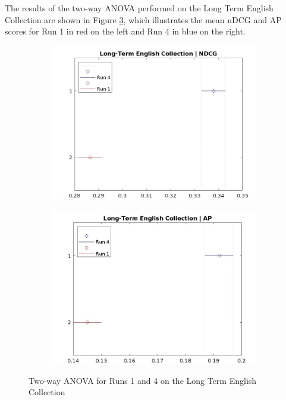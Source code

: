 The results of the two-way \ac{ANOVA} performed on the Long Term English Collection are shown in Figure \ref{fig:lt_anova_eng}, which illustrates the mean \ac{nDCG} and \ac{AP} scores for Run 1 in red on the left and Run 4 in blue on the right. 

\begin{figure}[!h]
    \centering
    \begin{subfigure}[b]{0.49\textwidth}
        \centering
        \includegraphics[width=\textwidth]{figure/StatisticalAnalysis/ANOVA 2/ndcg-lt-en.jpeg}
        \label{fig:lt_anova_eng_ndcg}
    \end{subfigure}
    \hfill
    \begin{subfigure}[b]{0.49\textwidth}
        \centering
        \includegraphics[width=\textwidth]{figure/StatisticalAnalysis/ANOVA 2/ap-lt-en.jpeg}
        \label{fig:lt_anova_eng_ap}
    \end{subfigure}
    \caption{Two-way ANOVA for Runs 1 and 4 on the Long Term English Collection}
    \label{fig:lt_anova_eng}
\end{figure}


